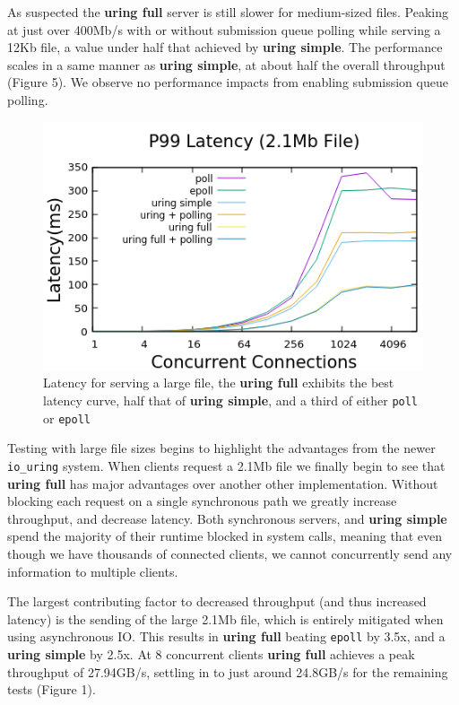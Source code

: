 \documentclass[conference]{IEEEtran}{}
\begin{document}
As suspected the \textbf{uring full} server is still slower for medium-sized files. Peaking at just over 400Mb/s with or without submission queue polling while serving a 12Kb file, a value under half that achieved by \textbf{uring simple}. The performance scales in a same manner as \textbf{uring simple}, at about half the overall throughput (Figure 5). We observe no performance impacts from enabling submission queue polling.

\begin{figure}
\centering
\includegraphics[width=4.5in]{big_latency.png}
\caption{Latency for serving a large file, the \textbf{uring full} exhibits the best latency curve, half that of \textbf{uring simple}, and a third of either \texttt{poll} or \texttt{epoll}}
\end{figure}

Testing with large file sizes begins to highlight the advantages from the newer \texttt{io\_uring} system. When clients request a 2.1Mb file we finally begin to see that \textbf{uring full} has major advantages over another other implementation. Without blocking each request on a single synchronous path we greatly increase throughput, and decrease latency. Both synchronous servers, and \textbf{uring simple} spend the majority of their runtime blocked in system calls, meaning that even though we have thousands of connected clients, we cannot concurrently send any information to multiple clients.

The largest contributing factor to decreased throughput (and thus increased latency) is the sending of the large 2.1Mb file, which is entirely mitigated when using asynchronous IO. This results in \textbf{uring full} beating \texttt{epoll} by 3.5x, and a \textbf{uring simple} by 2.5x. At 8 concurrent clients \textbf{uring full} achieves a peak throughput of 27.94GB/s, settling in to just around 24.8GB/s for the remaining tests (Figure 1).
\end{document}
